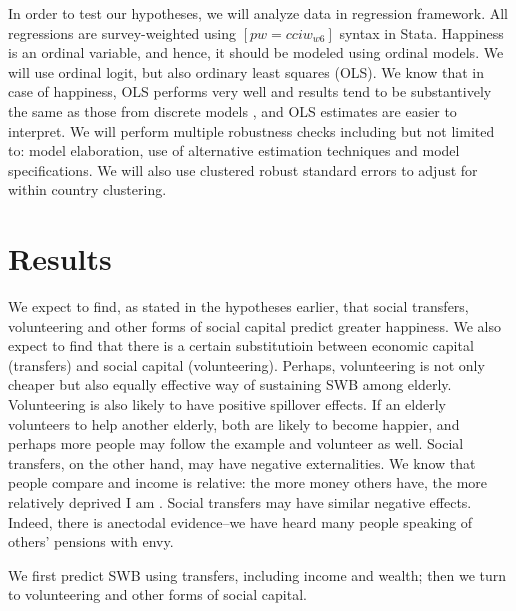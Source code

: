 \documentclass[10pt, letterpaper]{article}
\begin{document}
\begin{spacing}{1.4}
In order to test our hypotheses, we will analyze data in regression framework. 
 All regressions are survey-weighted using $[pw=cciw_{w6}]$ syntax in Stata.
Happiness is an ordinal variable, and hence, it should be modeled using ordinal
models. We will use ordinal logit, but also ordinary least squares (OLS). We know that
in case of happiness, OLS performs very well and results tend to be substantively
the same as those from discrete models \citep{carbonell04,blanchflower11}, and
OLS estimates are easier to interpret.
We will perform multiple robustness checks including but not limited to: model
elaboration, use of alternative estimation techniques and model specifications.
We will also use clustered robust standard errors to adjust for within country clustering.



\section{Results}


 We expect to
find, as stated in the hypotheses earlier, that social transfers, volunteering
and other forms of social capital predict greater happiness. We also expect to
find that there is a  certain substitutioin  between economic capital (transfers) and social
capital (volunteering). Perhaps, volunteering is not only cheaper but also equally
effective way of sustaining SWB among elderly. Volunteering is also likely to have
positive spillover effects. If an elderly volunteers to help another elderly,
both are  likely to become happier, and perhaps more people may follow the
example and volunteer as well. Social transfers, on the other hand, may have
negative externalities. We know that people compare and income is relative: the
more money others have, the more relatively deprived I am
\citep{michalos85,luttmer05,bender12}. Social transfers may have similar negative
effects. Indeed, there is anectodal evidence--we have heard many people speaking
of others' pensions with envy.

We first predict SWB using transfers, including income and wealth; then we turn
to volunteering and other forms of social capital.


\end{spacing}
\end{document}
